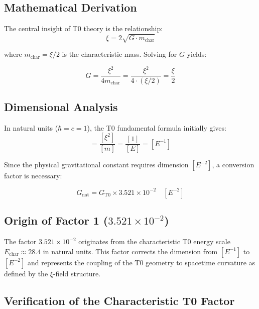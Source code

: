 \documentclass[12pt,a4paper]{report}
\begin{document}
	\subsection{Mathematical Derivation}
	
	The central insight of T0 theory is the relationship:
	\begin{equation}
		\xi = 2\sqrt{G \cdot m_{\text{char}}}
	\end{equation}
	
	where $m_{\text{char}} = \xi/2$ is the characteristic mass. Solving for $G$ yields:
	
	\begin{equation}
		\boxed{G = \frac{\xi^2}{4m_{\text{char}}} = \frac{\xi^2}{4 \cdot (\xi/2)} = \frac{\xi}{2}}
	\end{equation}
	
	\subsection{Dimensional Analysis}
	
	In natural units ($\hbar = c = 1$), the T0 fundamental formula initially gives:
	\begin{equation}
		[G_{\text{T0}}] = \frac{[\xi^2]}{[m]} = \frac{[1]}{[E]} = [E^{-1}]
	\end{equation}
	
	Since the physical gravitational constant requires dimension $[E^{-2}]$, a conversion factor is necessary:
	
	\begin{equation}
		G_{\text{nat}} = G_{\text{T0}} \times 3.521 \times 10^{-2} \quad [E^{-2}]
	\end{equation}
	
	\subsection{Origin of Factor 1 ($3.521 \times 10^{-2}$)}
	
	The factor $3.521 \times 10^{-2}$ originates from the characteristic T0 energy scale $E_{\text{char}} \approx 28.4$ in natural units. This factor corrects the dimension from $[E^{-1}]$ to $[E^{-2}]$ and represents the coupling of the T0 geometry to spacetime curvature as defined by the $\xi$-field structure.
	
	\subsection{Verification of the Characteristic T0 Factor}
	
\end{document}
